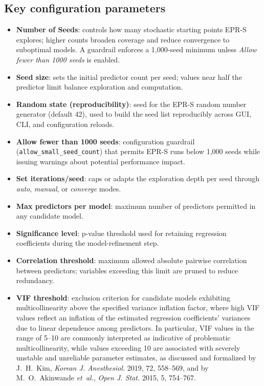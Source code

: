 \documentclass[11pt,a4paper]{article}
\begin{document}
\subsection{Key configuration parameters}
\begin{itemize}
  \item \textbf{Number of Seeds}: controls how many stochastic starting points EPR-S explores; higher counts broaden coverage and reduce convergence to suboptimal models. A guardrail enforces a 1{,}000-seed minimum unless \emph{Allow fewer than 1000 seeds} is enabled.
  \item \textbf{Seed size}: sets the initial predictor count per seed; values near half the predictor limit balance exploration and computation.
  \item \textbf{Random state (reproducibility)}: seed for the EPR-S random number generator (default 42), used to build the seed list reproducibly across GUI, CLI, and configuration reloads.
  \item \textbf{Allow fewer than 1000 seeds}: configuration guardrail (\texttt{allow\_small\_seed\_count}) that permits EPR-S runs below 1{,}000 seeds while issuing warnings about potential performance impact.
  \item \textbf{Set iterations/seed}: caps or adapts the exploration depth per seed through \emph{auto}, \emph{manual}, or \emph{converge} modes.
  \item \textbf{Max predictors per model}: maximum number of predictors permitted in any candidate model.
  \item \textbf{Significance level}: p-value threshold used for retaining regression coefficients during the model-refinement step.
  \item \textbf{Correlation threshold}: maximum allowed absolute pairwise correlation between predictors; variables exceeding this limit are pruned to reduce redundancy.
  \item \textbf{VIF threshold}: exclusion criterion for candidate models exhibiting multicollinearity above the specified variance inflation factor, where high VIF values reflect an inflation of the estimated regression coefficients’ variances due to linear dependence among predictors. In particular, VIF values in the range of 5–10 are commonly interpreted as indicative of problematic multicollinearity, while values exceeding 10 are associated with severely unstable and unreliable parameter estimates, as discussed and formalized by J.~H.~Kim, \emph{Korean J. Anesthesiol.} 2019, 72, 558--569, and by M.~O.~Akinwande \emph{et~al.}, \emph{Open J. Stat.} 2015, 5, 754--767.

\end{itemize}
\end{document}

